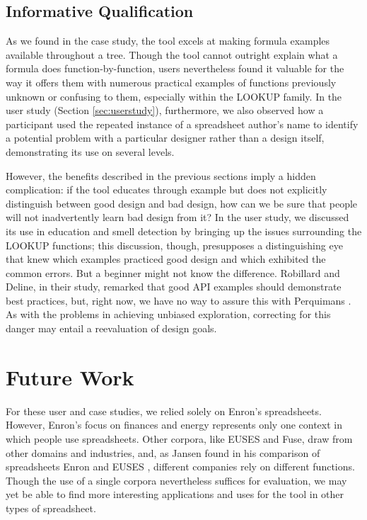 \documentclass[conference]{IEEEtran}
\newcommand{\toolname}{Perquimans }
\begin{document}
	\subsection{Informative Qualification} As we found in the case study, the tool
	excels at making formula examples available throughout a tree. Though the tool
	cannot outright explain what a formula does function-by-function, users
	nevertheless found it valuable for the way it offers them with numerous
	practical examples of functions previously unknown or confusing to them,
	especially within the LOOKUP family. In the user study (Section
	\ref{sec:userstudy}), furthermore, we also observed how a participant used the
	repeated instance of a spreadsheet author's name to identify a potential
	problem with a particular designer rather than a design itself, demonstrating
	its use on several levels. \par
	
	However, the benefits described in the previous sections imply a hidden
	complication: if the tool educates through example but does not explicitly
	distinguish between good design and bad design, how can we be sure that people
	will not inadvertently learn bad design from it? In the user study, we discussed
	its use in education and smell detection by bringing up the issues surrounding
	the LOOKUP functions; this discussion, though, presupposes a distinguishing eye
	that knew which examples practiced good design and which exhibited the common
	errors. But a beginner might not know the difference. Robillard and Deline, in
	their study, remarked that good API examples should demonstrate best practices,
	but, right now, we have no way to assure this with \toolname. As with the
	problems in achieving unbiased exploration, correcting for this danger may
	entail a reevaluation of design goals.
	
	\section{Future Work} For these user and case studies, we relied solely on
	Enron's spreadsheets. However, Enron's focus on finances and energy represents
	only one context in which people use spreadsheets. Other corpora, like EUSES
	and Fuse, draw from other domains and industries, and, as Jansen found in his
	comparison of spreadsheets Enron and EUSES \cite{jansen2015enron}, different
	companies rely on different functions. Though the use of a single corpora
	nevertheless suffices for evaluation, we may yet be able to find more
	interesting applications and uses for the tool in other types of spreadsheet.
	\par
	
\end{document}
